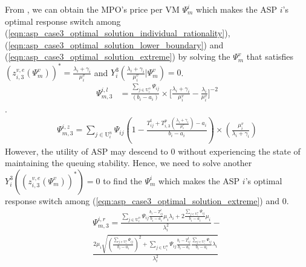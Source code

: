\documentclass[10pt,journal, compsoc]{IEEEtran}
\begin{document}
From , we can obtain the MPO's price per VM $\Psi_m^i$ which makes the ASP $i$'s optimal response switch among (\ref{eqn:asp_case3_optimal_solution_individual_rationality}), (\ref{eqn:asp_case3_optimal_solution_lower_boundary}) and (\ref{eqn:asp_case3_optimal_solution_extreme}) by solving the $\Psi_m^v$ that satisfies $(z_{i,3}^{v,e}(\Psi_m^v))^* = \frac{\lambda_i+\gamma_i}{\mu_i^v}$ and $Y_i^3(\frac{\lambda_i+\gamma_i}{\mu_i^v}|\Psi_m^v) = 0$.
\begin{equation}
\begin{aligned}
\Psi_{m,3}^{i,l}&= \frac{\sum_{j \in \mathrm{U}_i^n}\Psi_{ij}}{(b_i-a_i)}\times \big[\frac{\lambda_i+\gamma_i}{\mu_i^v} - \frac{\lambda_i}{\mu_i^v}\big]^{-2}
\end{aligned}
\end{equation}.
\begin{equation}
\begin{aligned}
\Psi_{m,3}^{i,z}= \sum_{j \in \mathrm{U}_i^n}\Psi_{ij}(1-\frac{T_{ij}^t + T_{i,3}^p(\frac{\lambda_i+\gamma_i}{\mu_i^v})-a_i}{b_i-a_i})\times(\frac{\mu_i^v}{\lambda_i+\gamma_i})
\end{aligned}
\end{equation}
However, the utility of ASP may descend to $0$ without experiencing the state of maintaining the queuing stability. Hence, we need to solve another $Y_i^3((z_{i,3}^{v,e}(\Psi_m^v))^*) = 0$ to find the $\Psi_m^i$ which makes the ASP $i$'s optimal response switch among (\ref{eqn:asp_case3_optimal_solution_extreme}) and $0$. 
\begin{multline}
\Psi_{m,3}^{i,r} = \frac{\sum_{j \in \mathrm{U}_i^n}\Psi_{ij}\frac{b_i-T_{ij}^t }{b_i-a_i}\mu_i\lambda_i+2\frac{\sum_{j \in \mathrm{U}_i^n}\Psi_{ij}}{b_i-a_i}\mu_i}{\lambda_i^2}- \\
\frac{2\mu_i\sqrt{(\frac{\sum_{j \in \mathrm{U}_i^n}\Psi_{ij}}{b_i-a_i})^2+\sum_{j \in \mathrm{U}_i^n}\Psi_{ij}\frac{b_i-T_{ij}^t}{b_i-a_i}\frac{\sum_{j \in \mathrm{U}_i^n}\Psi_{ij}}{b_i-a_i}\lambda_i}}{\lambda_i^2}
\end{multline}
\end{document}

